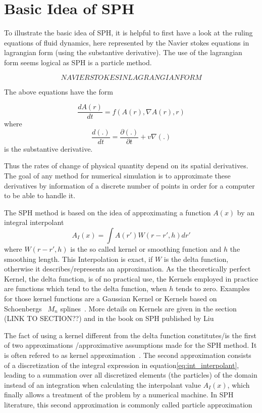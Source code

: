 \documentclass{report}
\begin{document}
\section{Basic Idea of SPH}
\label{sec:BasicsSPH}

To illustrate the basic idea of SPH, it is helpful to first have a look at the
ruling equations of fluid dynamics, here represented by the Navier stokes equations in
lagrangian form (using the substantive derivative). The use of the lagrangian form seems logical as SPH is a
particle method.

\begin {equation}
NAVIER STOKES IN LAGRANGIAN FORM
\end {equation}

The above equations have the form~\cite{Monaghan2005}

\begin {equation}
\label{eq:EFD_form}
{\frac{dA(r)}{dt}}=f(A(r),\nabla A(r),r)
\end {equation}
where
\begin {equation}
{\frac{d(.)}{dt}}={\frac{\partial(.)}{ \partial t}}+v\nabla(.)
\end{equation}
is the substantive derivative.

Thus the rates of change of  physical quantity depend on its spatial
derivatives. The goal of any method for numerical simulation is to approximate
these derivatives by information of a discrete number of points in order for a
computer to be able to handle it. 


The SPH method is based on the idea of approximating a function $A(x)$ by an
integral interpolant
\begin{equation}
\label{eq:int_interpolant}
A_I(x)=\int A(r')W(r-r',h)dr'
\end{equation}
where $W(r-r',h)$ is the so called kernel or smoothing function and $h$ the
smoothing length. This Interpolation is exact, if $W$ is the delta function,
otherwise it describes/represents an approximation. As the theoretically
perfect Kernel, the delta function, is of no practical use, the Kernels
employed in practice are functions which tend to the delta function, when $h$
tends to zero. Examples for those kernel functions are a Gaussian Kernel or
Kernels based on Schoenbergs~\cite{Schoenberg1946} $M_n$ splines~\cite{Monaghan2005}. More details on Kernels are given in the section
(LINK TO SECTION??) and in the book on SPH published by Liu~\cite{Liu2003}

The fact of using a kernel different from the delta function constitutes/is the
first of two approximations /approximative assumptions made for the SPH
method. It is often refered to as kernel approximation~\cite{Liu2003}.
The second approximation consists of a discretization of the integral
expression in equation\ref{eq:int_interpolant}, leading to a summation over
all discretized elements (the particles) of the domain instead
of an integration when calculating the interpolant value $A_I(x)$, which
finally allows a treatment of the problem by a numerical machine. In SPH
literature, this second approximation is commonly called particle
approximation~\cite{Liu2003}
\end{document}
